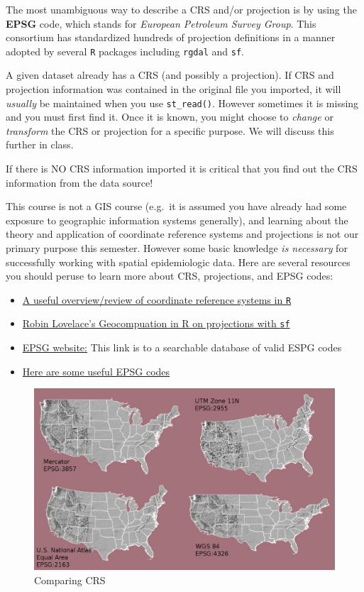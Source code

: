 \documentclass[
]{book}
\providecommand{\tightlist}{%
  \setlength{\itemsep}{0pt}\setlength{\parskip}{0pt}}
\newenvironment{rmdcaution}[1]
  {
  \begin{itemize}
  \renewcommand{\labelitemi}{
    \raisebox{-.7\height}[0pt][0pt]{
      {\setkeys{Gin}{width=3em,keepaspectratio}\texttt{[image: images/\#1]}}
    }
  }
  \setlength{\fboxsep}{1em}
  \begin{caution}
  \item
  }
  {
  \end{caution}
  \end{itemize}
  }
\begin{document}
The most unambiguous way to describe a CRS and/or projection is by using the \textbf{EPSG} code, which stands for \emph{European Petroleum Survey Group}. This consortium has standardized hundreds of projection definitions in a manner adopted by several \texttt{R} packages including \texttt{rgdal} and \texttt{sf}.

A given dataset already has a CRS (and possibly a projection). If CRS and projection information was contained in the original file you imported, it will \emph{usually} be maintained when you use \texttt{st\_read()}. However sometimes it is missing and you must first find it. Once it is known, you might choose to \emph{change} or \emph{transform} the CRS or projection for a specific purpose. We will discuss this further in class.

\begin{rmdcaution}{caution}
If there is NO CRS information imported it is critical that you find out the CRS information from the data source!

\end{rmdcaution}

This course is not a GIS course (e.g.~it is assumed you have already had some exposure to geographic information systems generally), and learning about the theory and application of coordinate reference systems and projections is not our primary purpose this semester. However some basic knowledge \emph{is necessary} for successfully working with spatial epidemiologic data. Here are several resources you should peruse to learn more about CRS, projections, and EPSG codes:

\begin{itemize}
\tightlist
\item
  \href{https://www.nceas.ucsb.edu/sites/default/files/2020-04/OverviewCoordinateReferenceSystems.pdf}{A useful overview/review of coordinate reference systems in \texttt{R}}
\item
  \href{https://geocompr.robinlovelace.net/reproj-geo-data.html}{Robin Lovelace's Geocompuation in R on projections with \texttt{sf}}
\item
  \href{https://epsg.io/}{EPSG website:} This link is to a searchable database of valid ESPG codes
\item
  \href{https://guides.library.duke.edu/r-geospatial/CRS}{Here are some useful EPSG codes}
\end{itemize}

\begin{figure}
\includegraphics[width=0.5\linewidth]{images/compare-crs} \caption{Comparing CRS}\label{fig:unnamed-chunk-14}
\end{figure}
\end{document}
